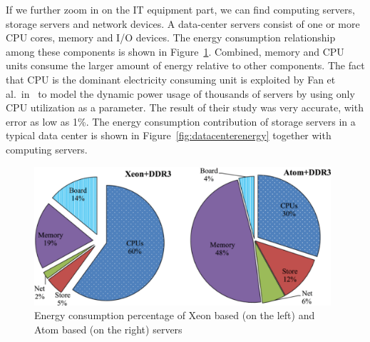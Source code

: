 If we further zoom in on the IT equipment part, we can find computing servers, storage servers and network devices. A data-center servers consist of one or more CPU cores, memory and I/O devices. The energy consumption relationship among these components is shown in Figure~\ref{fig:serverenergy}. Combined, memory and CPU units consume the larger amount of energy relative to other components. The fact that CPU is the dominant electricity consuming unit is exploited by Fan et al.{\ }in~\cite{DBLP:conf/isca/FanWB07} to model the dynamic power usage of thousands of servers by using only CPU utilization as a parameter. The result of their study was very accurate, with error as low as 1\%. The energy consumption contribution of storage servers in a typical data center is shown in Figure~\ref{fig:datacenterenergy} together with computing servers.
\begin{figure}[ht]
	\begin{center}
		\includegraphics[width=11cm]{images/serverenergy.pdf}
		\caption{Energy consumption percentage of Xeon based (on the left) and Atom based (on the right) servers \cite{DBLP:journals/comsur/DayarathnaWF16}}
		\label{fig:serverenergy}
	\end{center}
\end{figure}

